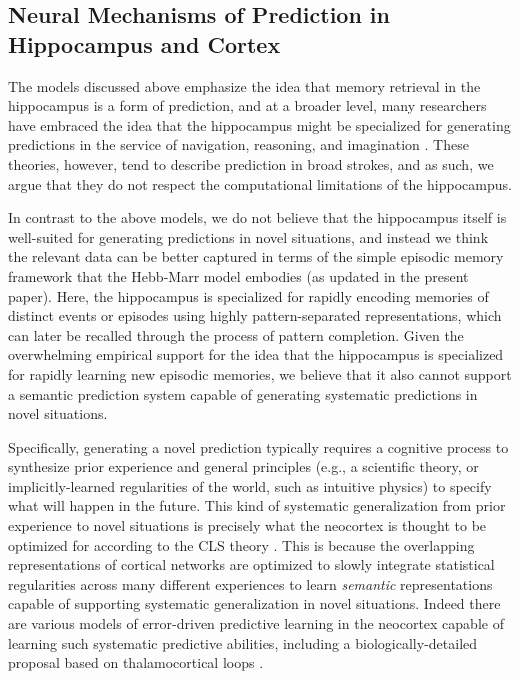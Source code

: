 \documentclass[11pt,twoside]{article}
\newif\myifpdf
\begin{document}
\subsection{Neural Mechanisms of Prediction in Hippocampus and Cortex}

The models discussed above emphasize the idea that memory retrieval in the hippocampus is a form of prediction, and at a broader level, many researchers have embraced the idea that the hippocampus might be specialized for generating predictions in the service of navigation, reasoning, and imagination \citep{DavachiDuBrow15,KokTurk-Browne18,Mizumori13,LismanRedish09,ZeithamovaSchlichtingPreston12,MackLovePreston18,ZeithamovaSchlichtingPreston12}. These theories, however, tend to describe prediction in broad strokes, and as such, we argue that they do not respect the computational limitations of the hippocampus.

In contrast to the above models, we do not believe that the hippocampus itself is well-suited for generating predictions in novel situations, and instead we think the relevant data can be better captured in terms of the simple episodic memory framework that the Hebb-Marr model embodies  (as updated in the present paper).  Here, the hippocampus is specialized for rapidly encoding memories of distinct events or episodes using highly pattern-separated representations, which can later be recalled through the process of pattern completion.  Given the overwhelming empirical support for the idea that the hippocampus is specialized for rapidly learning new episodic memories, we believe that it also cannot support a semantic prediction system capable of generating systematic predictions in novel situations.

Specifically, generating a novel prediction typically requires a cognitive process to synthesize prior experience and general principles (e.g., a scientific theory, or implicitly-learned regularities of the world, such as intuitive physics) to specify what will happen in the future.  This kind of systematic generalization from prior experience to novel situations is precisely what the neocortex is thought to be optimized for according to the CLS theory \citep{McClellandMcNaughtonOReilly95,OReillyBhattacharyyaHowardEtAl14,OReillyRanganathRussin21}.  This is because the overlapping representations of cortical networks are optimized to slowly integrate statistical regularities across many different experiences to learn \emph{semantic} representations capable of supporting systematic generalization in novel situations. Indeed there are various models of error-driven predictive learning in the neocortex capable of learning such systematic predictive abilities, including a biologically-detailed proposal based on thalamocortical loops \citep{OReillyRussinZolfagharEtAl21}. 
\end{document}
